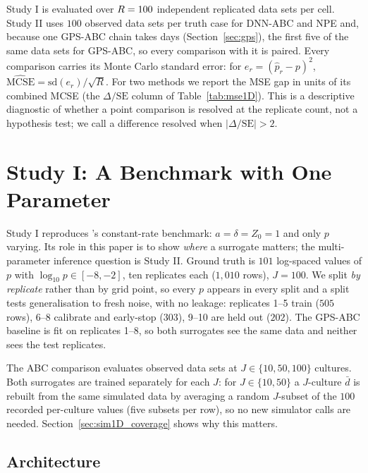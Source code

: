 \documentclass[sn-basic,iicol,pdflatex]{sn-jnl}
\newcommand{\dbar}{\ensuremath{\bar d}}
\begin{document}
Study I is evaluated over $R=100$ independent replicated data sets per cell. Study II
uses $100$ observed data sets per truth case for DNN-ABC and NPE and, because one
GPS-ABC chain takes days (Section~\ref{sec:gps}), the first five of the same data sets
for GPS-ABC, so every comparison with it is paired. Every comparison carries its Monte
Carlo standard error: for $e_r = (\hat p_r - p)^2$,
$\widehat{\mathrm{MCSE}} = \mathrm{sd}(e_r)/\sqrt{R}$. For two methods we report
the MSE gap in units of its combined MCSE (the $\Delta/\mathrm{SE}$ column of
Table~\ref{tab:mse1D}). This is a descriptive diagnostic of whether a point
comparison is resolved at the replicate count, not a hypothesis test; we call a
difference resolved when $|\Delta/\mathrm{SE}|>2$.

\section{Study I: A Benchmark with One Parameter}
\label{sec:sim1D}

Study I reproduces \citeauthor{lu2023}'s constant-rate benchmark: $a=\delta=Z_0=1$
and only $p$ varying. Its role in this paper is to show \emph{where} a surrogate
matters; the multi-parameter inference question is Study II. Ground truth is
$101$ log-spaced values of $p$ with $\log_{10}p \in [-8,-2]$, ten replicates each
($1{,}010$ rows), $J=100$. We split \emph{by replicate} rather than by grid
point, so every $p$ appears in every split and a split tests generalisation to
fresh noise, with no leakage: replicates 1--5 train ($505$ rows), 6--8 calibrate
and early-stop ($303$), 9--10 are held out ($202$). The GPS-ABC baseline is fit
on replicates 1--8, so both surrogates see the same data and neither sees the
test replicates.

The ABC comparison evaluates observed data sets at $J \in \{10, 50, 100\}$
cultures. Both surrogates are trained separately for each $J$: for $J \in
\{10, 50\}$ a $J$-culture $\dbar$ is rebuilt from the same simulated data by
averaging a random $J$-subset of the $100$ recorded per-culture values (five
subsets per row), so no new simulator calls are needed.
Section~\ref{sec:sim1D_coverage} shows why this matters.

\subsection{Architecture}
\label{sec:arch1D}
\end{document}
